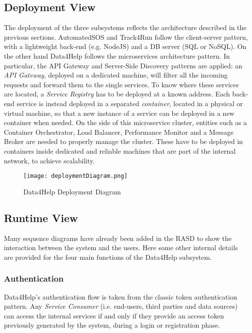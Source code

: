\subsection{Deployment View}
The deployment of the three subsystems reflects the architecture described in the previous sections. AutomatedSOS and Track4Run follow the client-server pattern, with a lightweight back-end (e.g. NodeJS) and a DB server (SQL or NoSQL).
On the other hand Data4Help follows the microservices architecture pattern. In particular, the API Gateway and Server-Side Discovery patterns are applied: an \textit{API Gateway}, deployed on a dedicated machine, will filter all the incoming requests and forward them to the single services. To know where these services are located, a \textit{Service Registry} has to be deployed at a known address. Each back-end service is instead deployed in a separated \textit{container}, located in a physical or virtual machine, so that 
a new instance of a service can be deployed in a new container when needed. On the side of this microservice cluster, entities such as a Container Orchestrator, Load Balancer, Performance Monitor and a Message Broker are needed to properly manage the cluster. These have to be deployed in containers inside dedicated and reliable machines that are part of the internal network, to achieve scalability.

\FloatBarrier
\begin{figure}[!h]
	\centering
	\texttt{[image: deploymentDiagram.png]}
	\caption{Data4Help Deployment Diagram}
\end{figure}
\FloatBarrier

\subsection{Runtime View}
Many sequence diagrams have already been added in the RASD to show the interaction between the system and the users. Here some other internal details are provided for the four main functions of the Data4Help subsystem.

\subsubsection{Authentication}
Data4Help's authentication flow is taken from the classic token authentication pattern. Any \textit{Service Consumer} (i.e. end-users, third parties and data sources) can access the internal services if and only if they provide an access token previously generated by the system, during a login or registration phase.

